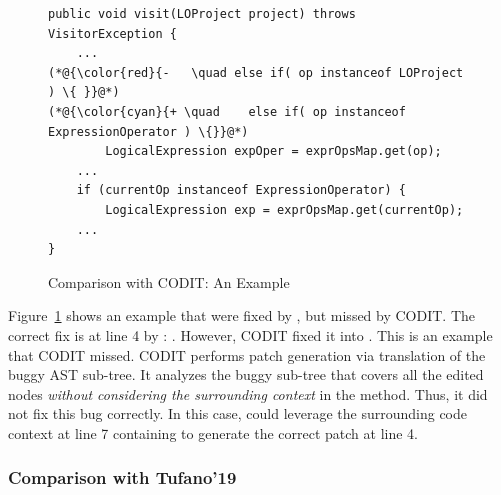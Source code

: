 \begin{figure}[t]
	\centering
	\begin{lstlisting}[]
public void visit(LOProject project) throws VisitorException {
    ...
(*@{\color{red}{-	\quad else if( op instanceof LOProject ) \{ }}@*)
(*@{\color{cyan}{+ \quad	else if( op instanceof ExpressionOperator ) \{}}@*)
		LogicalExpression expOper = exprOpsMap.get(op);
	...
	if (currentOp instanceof ExpressionOperator) {
		LogicalExpression exp = exprOpsMap.get(currentOp);
	...
}
	\end{lstlisting}
        \vspace{-15pt}
	\caption{Comparison with CODIT: An Example}
	\label{example_codit}
\end{figure}

Figure~\ref{example_codit} shows an example that were fixed by
{\tool}, but missed by CODIT. The correct fix is at line 4 by {\tool}:
   
.  However, CODIT fixed it into 
 . This is an example that CODIT missed.
CODIT performs patch generation via translation of the buggy AST
sub-tree. It analyzes the buggy sub-tree that covers all the edited
nodes {\em without considering the surrounding context} in the method.
Thus, it did not fix this bug correctly. In this case, {\tool} could
leverage the surrounding code context at line 7 containing
   to
generate the correct patch at line 4.


\subsubsection{\bf Comparison with Tufano'19}

